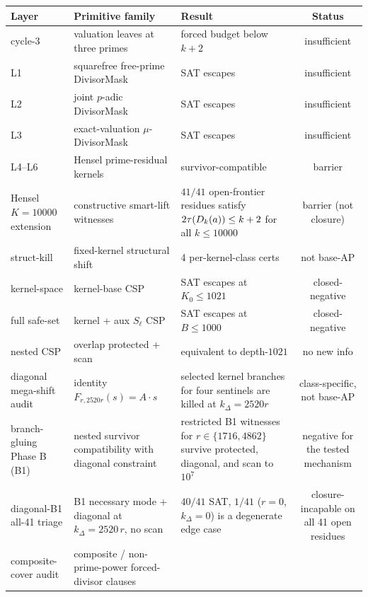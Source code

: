 \begin{table}[h]
\centering
\begin{tabular}{lllc}
\toprule
\textbf{Layer} & \textbf{Primitive family} & \textbf{Result} & \textbf{Status} \\
\midrule
cycle-3 & valuation leaves at three primes
        & forced budget below $k+2$
        & insufficient \\
L1 & squarefree free-prime DivisorMask
        & SAT escapes
        & insufficient \\
L2 & joint $p$-adic DivisorMask
        & SAT escapes
        & insufficient \\
L3 & exact-valuation $\mu$-DivisorMask
        & SAT escapes
        & insufficient \\
L4--L6 & Hensel prime-residual kernels
        & survivor-compatible
        & barrier \\
Hensel $K=10000$ extension
        & constructive smart-lift witnesses
        & $41 / 41$ open-frontier residues satisfy
          $2\tau(D_k(a)) \le k+2$ for all $k \le 10000$
        & barrier (not closure) \\
struct-kill & fixed-kernel structural shift
        & 4 per-kernel-class certs
        & not base-AP \\
kernel-space & kernel-base CSP
        & SAT escapes at $K_0 \le 1021$
        & closed-negative \\
full safe-set & kernel + aux $S_\ell$ CSP
        & SAT escapes at $B \le 1000$
        & closed-negative \\
nested CSP & overlap protected + scan
        & equivalent to depth-$1021$
        & no new info \\
\midrule
diagonal mega-shift audit
        & identity $F_{r,2520r}(s) = A\cdot s$
        & selected kernel branches for four sentinels are killed at $k_\Delta = 2520r$
        & class-specific, not base-AP \\
branch-gluing Phase B (B1)
        & nested survivor compatibility with diagonal constraint
        & restricted B1 witnesses for $r \in \{1716, 4862\}$ survive protected, diagonal, and scan to $10^7$
        & negative for the tested mechanism \\
diagonal-B1 all-41 triage
        & B1 necessary mode + diagonal at $k_\Delta = 2520\,r$, no scan
        & $40 / 41$ SAT, $1 / 41$ ($r = 0$, $k_\Delta = 0$) is a degenerate edge case
        & closure-incapable on all 41 open residues \\
composite-cover audit
        & composite / non-prime-power forced-divisor clauses

\end{tabular}
\end{table}
